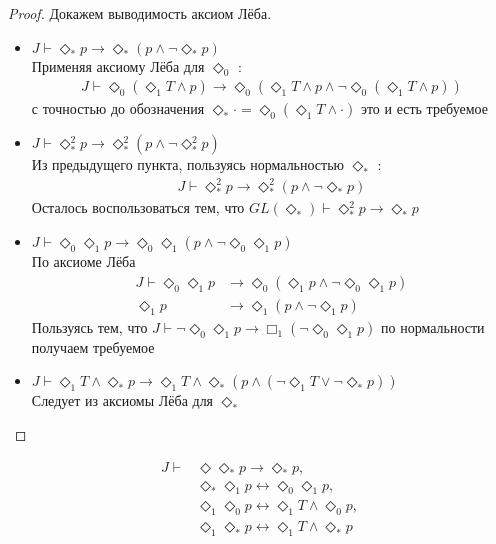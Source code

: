 \documentclass[12pt,a4paper,oneside]{article} \usepackage[left=2cm, right=2cm, top=1.3cm,
\begin{document}
  \begin{proof}
    Докажем выводимость аксиом Лёба.
    \begin{itemize}
      \item $J \vdash  \Diamond_* p \rightarrow  \Diamond_* (p \wedge  \neg \Diamond_* p)$ \\
            Применяя аксиому Лёба для $\Diamond_0 $ :
      \begin{align*}
        J \vdash  \Diamond_0 (\Diamond_1 T \wedge  p) \rightarrow  \Diamond_0 (\Diamond_1 T \wedge 
        p \wedge  \neg \Diamond_0 (\Diamond_1 T \wedge  p))
      \end{align*}
      с точностью до обозначения $\Diamond_* \cdot = \Diamond_0 (\Diamond_1 T \wedge  \cdot)$ это и
      есть требуемое
      \item $J \vdash  \Diamond_* ^2 p \rightarrow  \Diamond_* ^2(p \wedge  \neg \Diamond_* ^2 p)$
            \\ Из предыдущего пункта, пользуясь нормальностью $\Diamond_* $ :
      \begin{align*}
        J \vdash  \Diamond_* ^2 p \rightarrow  \Diamond_* ^2(p \wedge  \neg \Diamond_* p)
      \end{align*}
      Осталось воспользоваться тем, что $GL(\Diamond_* ) \vdash  \Diamond_* ^2 p \rightarrow 
      \Diamond_* p$ 
      \item $J \vdash  \Diamond_0 \Diamond_1 p \rightarrow  \Diamond_0 \Diamond_1 (p \wedge 
            \neg \Diamond_0 \Diamond_1 p)$ \\ По аксиоме Лёба
      \begin{align*}
        J \vdash  \Diamond_0 \Diamond_1 p &\rightarrow  \Diamond_0 (\Diamond_1 p \wedge 
        \neg \Diamond_0 \Diamond_1 p)\\
        \Diamond_1 p &\rightarrow  \Diamond_1 (p \wedge  \neg \Diamond_1 p)
      \end{align*}
      Пользуясь тем, что $J \vdash  \neg \Diamond_0 \Diamond_1 p \rightarrow 
      \Box_1 (\neg \Diamond_0 \Diamond_1 p)$ по нормальности получаем требуемое
      \item $J \vdash  \Diamond_1 T \wedge  \Diamond_* p \rightarrow  \Diamond_1 T \wedge 
            \Diamond_* (p \wedge  (\neg \Diamond_1 T \vee  \neg \Diamond_* p))$ \\ Следует из
            аксиомы Лёба для $\Diamond_* $ 
    \end{itemize}
  \end{proof}

  \begin{lemma}
    \begin{align*}
      J \vdash  &\Diamond \Diamond_* p \rightarrow  \Diamond_* p,\\
      &\Diamond_* \Diamond_1 p \leftrightarrow  \Diamond_0 \Diamond_1 p,\\
      &\Diamond_1 \Diamond_0 p \leftrightarrow  \Diamond_1 T \wedge  \Diamond_0 p,\\
      &\Diamond_1 \Diamond_* p \leftrightarrow  \Diamond_1 T \wedge  \Diamond_* p
    \end{align*}
  \end{lemma}
\end{document}

